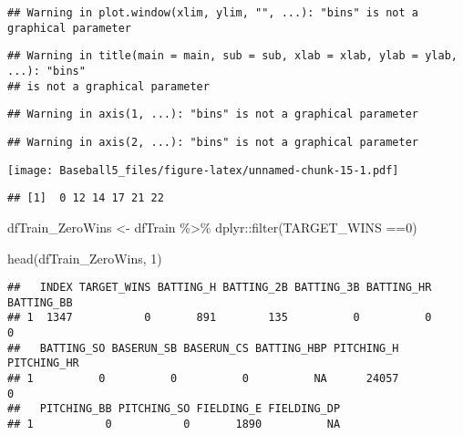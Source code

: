 \documentclass[
]{article}
\newenvironment{Shaded}{\begin{snugshade}}{\end{snugshade}}
\newcommand{\DecValTok}[1]{\textcolor[rgb]{0.00,0.00,0.81}{#1}}
\newcommand{\FunctionTok}[1]{\textcolor[rgb]{0.00,0.00,0.00}{#1}}
\newcommand{\NormalTok}[1]{#1}
\newcommand{\OtherTok}[1]{\textcolor[rgb]{0.56,0.35,0.01}{#1}}
\newcommand{\SpecialCharTok}[1]{\textcolor[rgb]{0.00,0.00,0.00}{#1}}
\begin{document}
\begin{verbatim}
## Warning in plot.window(xlim, ylim, "", ...): "bins" is not a graphical parameter
\end{verbatim}

\begin{verbatim}
## Warning in title(main = main, sub = sub, xlab = xlab, ylab = ylab, ...): "bins"
## is not a graphical parameter
\end{verbatim}

\begin{verbatim}
## Warning in axis(1, ...): "bins" is not a graphical parameter
\end{verbatim}

\begin{verbatim}
## Warning in axis(2, ...): "bins" is not a graphical parameter
\end{verbatim}

\texttt{[image: Baseball5\_files/figure-latex/unnamed-chunk-15-1.pdf]}

\begin{Shaded}
\end{Shaded}

\begin{verbatim}
## [1]  0 12 14 17 21 22
\end{verbatim}

\begin{Shaded}
\begin{Highlighting}[]
\NormalTok{dfTrain\_ZeroWins }\OtherTok{\textless{}{-}}\NormalTok{ dfTrain }\SpecialCharTok{\%\textgreater{}\%}
\NormalTok{  dplyr}\SpecialCharTok{::}\FunctionTok{filter}\NormalTok{(TARGET\_WINS }\SpecialCharTok{==}\DecValTok{0}\NormalTok{)}

\FunctionTok{head}\NormalTok{(dfTrain\_ZeroWins, }\DecValTok{1}\NormalTok{)}
\end{Highlighting}
\end{Shaded}

\begin{verbatim}
##   INDEX TARGET_WINS BATTING_H BATTING_2B BATTING_3B BATTING_HR BATTING_BB
## 1  1347           0       891        135          0          0          0
##   BATTING_SO BASERUN_SB BASERUN_CS BATTING_HBP PITCHING_H PITCHING_HR
## 1          0          0          0          NA      24057           0
##   PITCHING_BB PITCHING_SO FIELDING_E FIELDING_DP
## 1           0           0       1890          NA
\end{verbatim}
\end{document}
